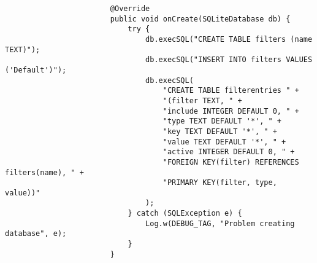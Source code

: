 \begin{enumerate}
\begin{itemize}
                    \begin{verbatim}
                        @Override
                        public void onCreate(SQLiteDatabase db) {
                            try {
                                db.execSQL("CREATE TABLE filters (name TEXT)");
                                db.execSQL("INSERT INTO filters VALUES ('Default')");
                                db.execSQL(
                                    "CREATE TABLE filterentries " +
                                    "(filter TEXT, " +
                                    "include INTEGER DEFAULT 0, " +
                                    "type TEXT DEFAULT '*', " +
                                    "key TEXT DEFAULT '*', " +
                                    "value TEXT DEFAULT '*', " +
                                    "active INTEGER DEFAULT 0, " +
                                    "FOREIGN KEY(filter) REFERENCES filters(name), " +
                                    "PRIMARY KEY(filter, type, value))"
                                );
                            } catch (SQLException e) {
                                Log.w(DEBUG_TAG, "Problem creating database", e);
                            }
                        }


\end{verbatim}
\end{itemize}
\end{enumerate}

